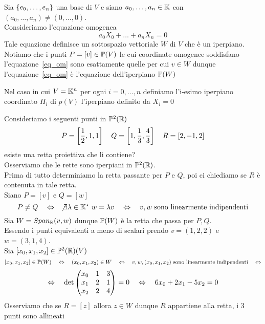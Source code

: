\spazio
\begin{oss}Sia $\left\{ e_0, \dots, e_n \right\}$ una base di $V$ e siano $a_0,\dots, a_n \in \mathbb{K}$ con $(a_0, \dots, a_n) \neq (0, \dots, 0)$.\\
Consideriamo l'equazione omogenea
\begin{equation}
\label{eq_om}
a_0X_0+ \dots + a_n X_n =0
\end{equation}
Tale equazione definisce un sottospazio vettoriale $W$ di $V$ che \`e un iperpiano.\\
Notiamo che i punti $P=[v]\in\mathbb{P}(V)$ le cui coordinate omogenee soddisfano l'equazione~\ref{eq_om} sono esattamente quelle per cui $v\in W$ dunque l'equazione~\ref{eq_om} \`e l'equazione dell'iperpiano $\mathbb{P}(W)$
\end{oss}
\begin{defn}Nel caso in cui $V = \mathbb{K}^n$ per ogni $i=0, \dots, n$ definiamo l'i-esimo iperpiano coordinato $H_i$ di $p(V)$ l'iperpiano definito da $X_i=0$
\end{defn}
\spazio
\begin{ese}Consideriamo i seguenti punti in $\mathbb{P}^2 (\mathbb{R}) $ 
$$ P =\left[ \frac{1}{2},1,1 \right] \quad Q = \left[ 1, \frac{1}{3}, \frac{4}{3} \right] \quad R =[2,-1,2]$$
esiste una retta proiettiva che  li contiene?\\
Osserviamo che le rette sono iperpiani in $\mathbb{P}^2 (\mathbb{R}) $.\\
Prima di tutto determiniamo la retta passante per $P$ e $Q$, poi ci chiediamo se $R$ \`e contenuta in tale retta.\\
Siano $P=[v]$ e $Q=[w]$
$$P\neq Q \quad \Leftrightarrow \quad \not\exists \lambda\in \mathbb{K}^\star \, \, w =\lambda	 v\quad \Leftrightarrow \quad v,w \text{ sono linearmente indipendenti}$$
Sia $W=Span_{\mathbb{R}}(v,w)$ dunque $\mathbb{P}(W)$ \`e la retta che passa per $P,Q$.\\
Essendo i punti equivalenti a meno di scalari prendo $v=(1,2,2)$ e $w=(3,1,4)$.\\
Sia $[x_0, x_1, x_2]\in\mathbb{P}^2 (\mathbb{R})(V)$
$$ [x_0, x_1, x_2]\in\mathbb{P}(W) \quad \Leftrightarrow \quad (x_0,x_1,x_2)\in W\quad \Leftrightarrow \quad v,w,(x_0,x_1,x_2)\text{ sono linearmente indipendenti} \quad \Leftrightarrow $$
$$\Leftrightarrow \quad \det \begin{pmatrix}
x_0 & 1 & 3 \\
x_1 &  2 & 1 \\
x_2 & 2 & 4 
\end{pmatrix}=0 \quad \Leftrightarrow \quad 6x_0+ 2x_1-5x_2=0$$
Osserviamo che se $R=[z]$ allora $z\in W$ dunque $R$ appartiene alla retta, i 3 punti sono allineati
\end{ese}
